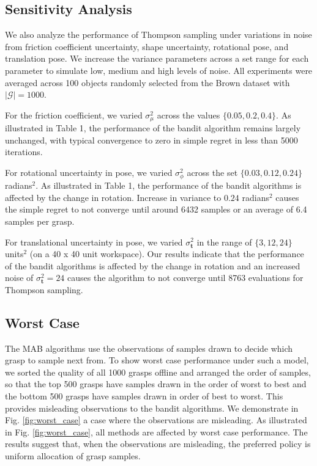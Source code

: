 \documentclass[10pt, conference]{ieeeconf}      %
\newcommand{\bt}{\mathbf{t}}
\newcommand{\mG}{\mathcal{G}}
\begin{document}
\subsection{Sensitivity Analysis }\label{sec:sensitivity}
We also analyze the performance of Thompson sampling under variations in noise from friction coefficient uncertainty, shape uncertainty, rotational pose, and translation pose.
We increase the variance parameters across a set range for each parameter to simulate low, medium and high levels of noise.
All experiments were averaged across 100 objects randomly selected  from the Brown dataset with $|\mG| = 1000$.

For the friction coefficient, we varied $\sigma^2_{\mu}$ across the values $\lbrace 0.05, 0.2, 0.4 \rbrace$.
As illustrated in Table 1, the performance of the bandit algorithm remains largely unchanged, with typical convergence
to zero in simple regret in less than 5000 iterations.

For rotational uncertainty in pose, we varied $\sigma^2_{\phi}$ across the set $\lbrace 0.03, 0.12,0.24\rbrace$ radians$^2$. As illustrated in Table 1, the performance of the bandit algorithms is affected by the change in rotation. Increase in variance to $0.24$ radians$^2$  causes the  simple regret to not converge until around 6432 samples or an average of 6.4 samples per grasp. 

For translational uncertainty in pose, we varied $\sigma^2_{\bt}$ in the range of $\lbrace 3,12, 24 \rbrace$ units$^2$ (on a 40 x 40 unit workspace). Our results indicate that the performance of the bandit algorithms is affected by the change in rotation and an increased noise of $\sigma^2_{\bt} = 24$ causes the algorithm to not converge until 8763 evaluations for Thompson sampling. 



\subsection{Worst Case}
The MAB algorithms use the observations of samples drawn to decide which grasp to sample next from. To show worst case performance under such a model, we sorted the quality of all 1000 grasps offline and arranged the order of samples, so that the top 500 grasps have samples drawn in the order of worst to best and the bottom 500 grasps have samples drawn in order of best to worst. This provides misleading observations to the bandit algorithms. We demonstrate in Fig. \ref{fig:worst_case} a case where the observations are misleading. As illustrated in Fig. \ref{fig:worst_case}, all methods are affected by worst case performance. The results suggest that, when the observations are misleading, the preferred policy is uniform allocation of grasp samples.
\end{document}
